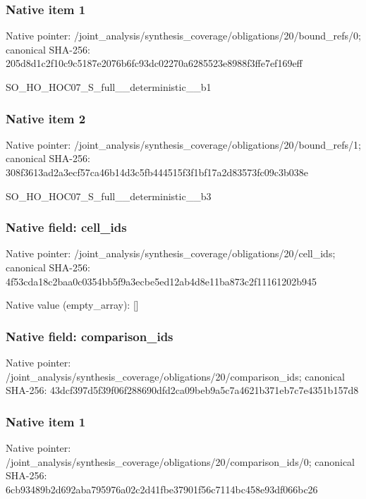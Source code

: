 \documentclass[10pt,a4paper]{article}
\begin{document}
\subsubsection{Native item 1}
Native pointer: /joint\_\allowbreak{}analysis/synthesis\_\allowbreak{}coverage/obligations/20/bound\_\allowbreak{}refs/0; canonical SHA-256: 205d8d1c2f10c9c5187e2076b6fc93dc02270a6285523e8988f3ffe7ef169eff

\begingroup\raggedright\sloppy SO\_\allowbreak{}HO\_\allowbreak{}HOC07\_\allowbreak{}S\_\allowbreak{}full\_\allowbreak{}\_\allowbreak{}deterministic\_\allowbreak{}\_\allowbreak{}b1\par\endgroup

\subsubsection{Native item 2}
Native pointer: /joint\_\allowbreak{}analysis/synthesis\_\allowbreak{}coverage/obligations/20/bound\_\allowbreak{}refs/1; canonical SHA-256: 308f3613ad2a3ecf57ca46b14d3c5fb444515f3f1bf17a2d83573fc09c3b038e

\begingroup\raggedright\sloppy SO\_\allowbreak{}HO\_\allowbreak{}HOC07\_\allowbreak{}S\_\allowbreak{}full\_\allowbreak{}\_\allowbreak{}deterministic\_\allowbreak{}\_\allowbreak{}b3\par\endgroup

\subsubsection{Native field: cell\_\allowbreak{}ids}
Native pointer: /joint\_\allowbreak{}analysis/synthesis\_\allowbreak{}coverage/obligations/20/cell\_\allowbreak{}ids; canonical SHA-256: 4f53cda18c2baa0c0354bb5f9a3ecbe5ed12ab4d8e11ba873c2f11161202b945

Native value (empty\_\allowbreak{}array): []

\subsubsection{Native field: comparison\_\allowbreak{}ids}
Native pointer: /joint\_\allowbreak{}analysis/synthesis\_\allowbreak{}coverage/obligations/20/comparison\_\allowbreak{}ids; canonical SHA-256: 43dcf397d5f39f06f288690dfd2ca09beb9a5c7a4621b371eb7c7e4351b157d8

\subsubsection{Native item 1}
Native pointer: /joint\_\allowbreak{}analysis/synthesis\_\allowbreak{}coverage/obligations/20/comparison\_\allowbreak{}ids/0; canonical SHA-256: 6cb93489b2d692aba795976a02c2d41fbe37901f56c7114bc458e93df066bc26
\end{document}
